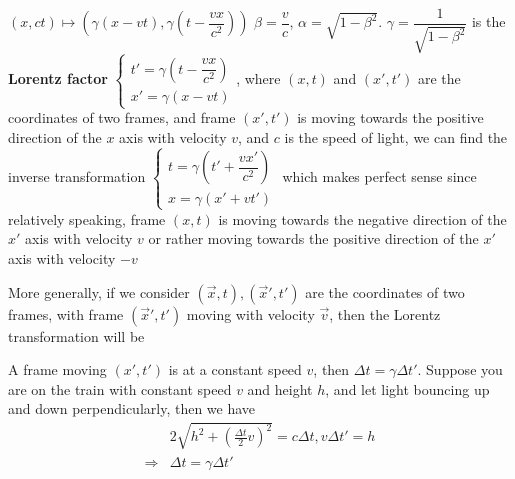 \documentclass[main]{subfiles}
\begin{document}
\begin{definition}

$(x,ct)\mapsto \left(\gamma\left(x-vt\right),\gamma\left(t-\dfrac{vx}{c^2}\right)\right)
$
$\beta=\dfrac{v}{c}$, $\alpha=\sqrt{1-\beta^2}$. $\gamma=\dfrac{1}{\sqrt{1-\beta^2}}$ is the \textbf{Lorentz factor}
$
\begin{cases}
t'=\gamma\left(t-\dfrac{vx}{c^2}\right) \\
x'=\gamma\left(x-vt\right)
\end{cases}
$, where $(x,t)$ and $(x',t')$ are the coordinates of two frames, and frame $(x',t')$ is moving towards the positive direction of the $x$ axis with velocity $v$, and $c$ is the speed of light, we can find the inverse transformation $
\begin{cases}
t=\gamma\left(t'+\dfrac{vx'}{c^2}\right) \\
x=\gamma\left(x'+vt'\right)
\end{cases}
$ which makes perfect sense since relatively speaking, frame $(x,t)$ is moving towards the negative direction of the $x'$ axis with velocity $v$ or rather moving towards the positive direction of the $x'$ axis with velocity $-v$
\begin{center}
\end{center}
More generally, if we consider $(\vec{x},t),(\vec{x}',t')$ are  the coordinates of two frames, with frame $(\vec{x}',t')$ moving with velocity $\vec{v}$, then the Lorentz transformation will be
\end{definition}

\begin{deduction}
A frame moving $(x',t')$ is at a constant speed $v$, then $\Delta t=\gamma\Delta t'$. Suppose you are on the train with constant speed $v$ and height $h$, and let light bouncing up and down perpendicularly, then we have
\begin{align*}
&2\sqrt{h^2+\left(\frac{\Delta t}{2}v\right)^2}=c\Delta t, v\Delta t'=h \\
\Rightarrow& \Delta t=\gamma\Delta t'
\end{align*}
\end{deduction}
\end{document}
